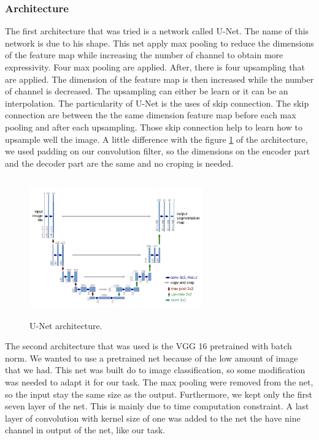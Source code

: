 \subsubsection{Architecture}
The first architecture that was tried is a network called U-Net. The name of this network is due to his shape. This net apply max pooling to reduce the dimensions of the feature map while increasing the number of channel to obtain more expressivity. Four max pooling are applied. After, there is four upsampling that are applied. The dimension of the feature map is then increased while the number of channel is decreased. The upsampling can either be learn or it can be an interpolation. The particularity of U-Net is the uses of skip connection. The skip connection are between the the same dimension feature map before each max pooling and after each upsampling. Those skip connection help to learn how to upsample well the image. A little difference with the figure \ref{fig:unet} of the architecture, we used padding on our convolution filter, so the dimensions on the encoder part and the decoder part are the same and no croping is needed.
\begin{figure}[H]
	\centering
	\includegraphics[width=7.5cm,height=6cm]{figures/unet-architecture.png}
	\caption{U-Net architecture.}
	\label{fig:unet}
\end{figure}

The second architecture that was used is the VGG 16 pretrained with batch norm. We wanted to use a pretrained net because of the low amount of image that we had. This net was built do to image classification, so some modification was needed to adapt it for our task. The max pooling were removed from the net, so the input stay the same size as the output. Furthermore, we kept only the first seven layer of the net. This is mainly due to time computation constraint. A last layer of convolution with kernel size of one was added to the net the have nine channel in output of the net, like our task. 

